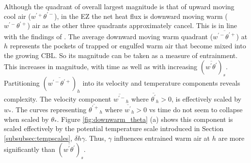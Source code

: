 Although the quadrant of overall largest magnitude is that of upward moving cool air ($w^{'+}\theta^{'-}$), in the EZ the net heat flux is downward moving warm ($w^{'-}\theta^{'+}$) air as the other three quadrants approximately cancel.  This is in line with the findings of \cite{SullMoengStev}.  The average downward moving warm quadrant ($\overline{w^{'-}\theta^{'+}}$) at $h$ represents the pockets of trapped or engulfed warm air that become mixed into the growing CBL.  So its magnitude can be taken as a measure of entrainment.  This increases in magnitude, with time as well as with increasing $(\overline{w^{'}\theta^{'}})_{s}$.  Partitioning $(\overline{w^{'-}\theta^{'+}})_{h}$ into its velocity and temperature components reveals complexity.  The velocity component $\overline{w^{'-}}_{h}$  where $ \overline{\theta^{'}}_{h}>0$, is effectively scaled by $w_{*}$.  The curves representing $\overline{\theta^{'+}}_{h}$ where $\overline{w^{'}}_{h}>0$ vs time do not seem to collapse when scaled by $\theta_{*}$.  Figure \ref{fig:downwarm_theta} (a) shows this component is scaled effectively by the potential temperature scale introduced in Section \ref{subsubsec:tempscales}, $\delta h \gamma$.  Thus, $\gamma$ influences entrained warm air at $h$ are more significantly than $(\overline{w^{'}\theta^{'}})_{s}$.\\ 
\\   

